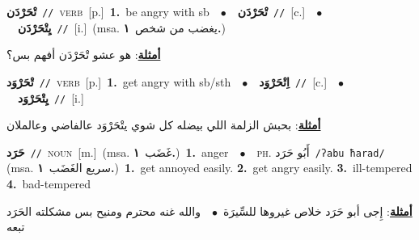 \documentclass[10pt,a4paper,twoside]{article} %
\begin{document}
\begin{multicols}{2}
{\setlength\topsep{0pt}\textbf{\foreignlanguage{arabic}{تْحَرْدَن}}\ {\color{gray}\texttt{//}\color{black}}\ \textsc{verb}\ [p.]\ \textbf{1.}~be angry with sb\ \ $\bullet$\ \ \setlength\topsep{0pt}\textbf{\foreignlanguage{arabic}{تْحَرْدَن}}\ {\color{gray}\texttt{//}\color{black}}\ [c.]\ \ $\bullet$\ \ \setlength\topsep{0pt}\textbf{\foreignlanguage{arabic}{يِتْحَرْدَن}}\ {\color{gray}\texttt{//}\color{black}}\ [i.]\ \color{gray}(msa. \foreignlanguage{arabic}{يغضب من شخص}~\foreignlanguage{arabic}{\textbf{١.}})\color{black}\  \begin{flushright}\color{gray}\foreignlanguage{arabic}{\textbf{\underline{\foreignlanguage{arabic}{أمثلة}}}: هو عشو تْحَرْدَن أفهم بس؟}\end{flushright}\color{black}} \vspace{2mm}

{\setlength\topsep{0pt}\textbf{\foreignlanguage{arabic}{تْحَرْوَد}}\ {\color{gray}\texttt{//}\color{black}}\ \textsc{verb}\ [p.]\ \textbf{1.}~get angry with sb/sth\ \ $\bullet$\ \ \setlength\topsep{0pt}\textbf{\foreignlanguage{arabic}{اِتْحَرْوَد}}\ {\color{gray}\texttt{//}\color{black}}\ [c.]\ \ $\bullet$\ \ \setlength\topsep{0pt}\textbf{\foreignlanguage{arabic}{يِتْحَرْوَد}}\ {\color{gray}\texttt{//}\color{black}}\ [i.]\  \begin{flushright}\color{gray}\foreignlanguage{arabic}{\textbf{\underline{\foreignlanguage{arabic}{أمثلة}}}: بحبش الزلمة اللي بيضله كل شوي يتْحَرْوَد عالفاضي وعالملان}\end{flushright}\color{black}} \vspace{2mm}

{\setlength\topsep{0pt}\textbf{\foreignlanguage{arabic}{حَرَد}}\ {\color{gray}\texttt{//}\color{black}}\ \textsc{noun}\ [m.]\ \color{gray}(msa. \foreignlanguage{arabic}{غَضَب}~\foreignlanguage{arabic}{\textbf{١.}})\color{black}\ \textbf{1.}~anger\ \ $\bullet$\ \ \textsc{ph.} \color{gray} \foreignlanguage{arabic}{أَبُو حَرَد}\color{black}\ {\color{gray}\texttt{/{\sffamily ʔabu ħarad}/}\color{black}}\ \color{gray} (msa. \foreignlanguage{arabic}{سريع الغَضَب}~\foreignlanguage{arabic}{\textbf{١.}})\color{black}\ \textbf{1.}~get annoyed easily.  \textbf{2.}~get angry easily.  \textbf{3.}~ill-tempered  \textbf{4.}~bad-tempered\  \begin{flushright}\color{gray}\foreignlanguage{arabic}{\textbf{\underline{\foreignlanguage{arabic}{أمثلة}}}: إِجى أبو حَرَد خلاص غيروها للسِّيرَة\ $\bullet$\ \  والله غنه محترم ومنيح بس مشكلته الحَرَد تبعه}\end{flushright}\color{black}} \vspace{2mm}


\end{multicols}
\end{document}

